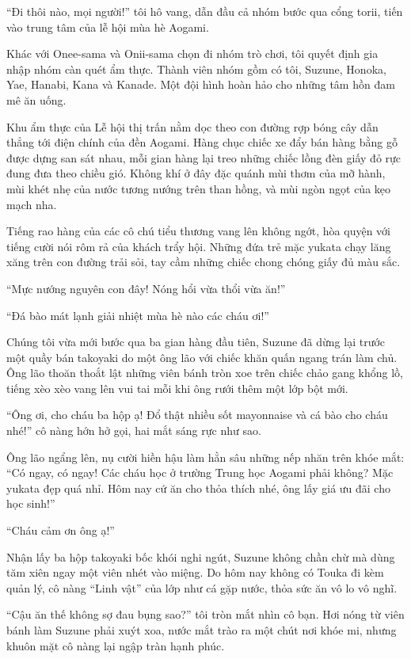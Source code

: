 \documentclass[../main.tex]{subfiles}
\begin{document}
``Đi thôi nào, mọi người!'' tôi hô vang, dẫn đầu cả nhóm bước qua cổng torii, tiến vào trung tâm của lễ hội mùa hè Aogami.

\ct

Khác với Onee-sama và Onii-sama chọn đi nhóm trò chơi, tôi quyết định gia nhập nhóm càn quét ẩm thực. Thành viên nhóm gồm có tôi, Suzune, Honoka, Yae, Hanabi, Kana và Kanade. Một đội hình hoàn hảo cho những tâm hồn đam mê ăn uống.

Khu ẩm thực của Lễ hội thị trấn nằm dọc theo con đường rợp bóng cây dẫn thẳng tới điện chính của đền Aogami. Hàng chục chiếc xe đẩy bán hàng bằng gỗ được dựng san sát nhau, mỗi gian hàng lại treo những chiếc lồng đèn giấy đỏ rực đung đưa theo chiều gió. Không khí ở đây đặc quánh mùi thơm của mỡ hành, mùi khét nhẹ của nước tương nướng trên than hồng, và mùi ngòn ngọt của kẹo mạch nha.

Tiếng rao hàng của các cô chú tiểu thương vang lên không ngớt, hòa quyện với tiếng cười nói rôm rả của khách trẩy hội. Những đứa trẻ mặc yukata chạy lăng xăng trên con đường trải sỏi, tay cầm những chiếc chong chóng giấy đủ màu sắc.

``Mực nướng nguyên con đây! Nóng hổi vừa thổi vừa ăn!''

``Đá bào mát lạnh giải nhiệt mùa hè nào các cháu ơi!''

Chúng tôi vừa mới bước qua ba gian hàng đầu tiên, Suzune đã dừng lại trước một quầy bán takoyaki do một ông lão với chiếc khăn quấn ngang trán làm chủ. Ông lão thoăn thoắt lật những viên bánh tròn xoe trên chiếc chảo gang khổng lồ, tiếng xèo xèo vang lên vui tai mỗi khi ông rưới thêm một lớp bột mới.

``Ông ơi, cho cháu ba hộp ạ! Đổ thật nhiều sốt mayonnaise và cá bào cho cháu nhé!'' cô nàng hớn hở gọi, hai mắt sáng rực như sao.

Ông lão ngẩng lên, nụ cười hiền hậu làm hằn sâu những nếp nhăn trên khóe mắt: ``Có ngay, có ngay! Các cháu học ở trường Trung học Aogami phải không? Mặc yukata đẹp quá nhỉ. Hôm nay cứ ăn cho thỏa thích nhé, ông lấy giá ưu đãi cho học sinh!''

``Cháu cảm ơn ông ạ!''

Nhận lấy ba hộp takoyaki bốc khói nghi ngút, Suzune không chần chừ mà dùng tăm xiên ngay một viên nhét vào miệng. Do hôm nay không có Touka đi kèm quản lý, cô nàng ``Linh vật'' của lớp như cá gặp nước, thỏa sức ăn vô lo vô nghĩ.

``Cậu ăn thế không sợ đau bụng sao?'' tôi tròn mắt nhìn cô bạn. Hơi nóng từ viên bánh làm Suzune phải xuýt xoa, nước mắt trào ra một chút nơi khóe mi, nhưng khuôn mặt cô nàng lại ngập tràn hạnh phúc.
\end{document}

